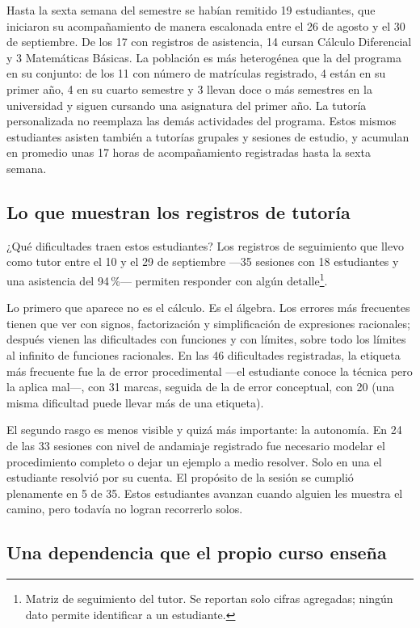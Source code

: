 Hasta la sexta semana del semestre se habían remitido 19 estudiantes, que iniciaron su acompañamiento de manera escalonada entre el 26 de agosto y el 30 de septiembre. De los 17 con registros de asistencia, 14 cursan Cálculo Diferencial y 3 Matemáticas Básicas. La población es más heterogénea que la del programa en su conjunto: de los 11 con número de matrículas registrado, 4 están en su primer año, 4 en su cuarto semestre y 3 llevan doce o más semestres en la universidad y siguen cursando una asignatura del primer año. La tutoría personalizada no reemplaza las demás actividades del programa. Estos mismos estudiantes asisten también a tutorías grupales y sesiones de estudio, y acumulan en promedio unas 17 horas de acompañamiento registradas hasta la sexta semana.

\subsection*{Lo que muestran los registros de tutoría}

¿Qué dificultades traen estos estudiantes? Los registros de seguimiento que llevo como tutor entre el 10 y el 29 de septiembre ---35 sesiones con 18 estudiantes y una asistencia del 94\,\%--- permiten responder con algún detalle\footnote{Matriz de seguimiento del tutor. Se reportan solo cifras agregadas; ningún dato permite identificar a un estudiante.}.

Lo primero que aparece no es el cálculo. Es el álgebra. Los errores más frecuentes tienen que ver con signos, factorización y simplificación de expresiones racionales; después vienen las dificultades con funciones y con límites, sobre todo los límites al infinito de funciones racionales. En las 46 dificultades registradas, la etiqueta más frecuente fue la de error procedimental ---el estudiante conoce la técnica pero la aplica mal---, con 31 marcas, seguida de la de error conceptual, con 20 (una misma dificultad puede llevar más de una etiqueta).

El segundo rasgo es menos visible y quizá más importante: la autonomía. En 24 de las 33 sesiones con nivel de andamiaje registrado fue necesario modelar el procedimiento completo o dejar un ejemplo a medio resolver. Solo en una el estudiante resolvió por su cuenta. El propósito de la sesión se cumplió plenamente en 5 de 35. Estos estudiantes avanzan cuando alguien les muestra el camino, pero todavía no logran recorrerlo solos.

\subsection*{Una dependencia que el propio curso enseña}

